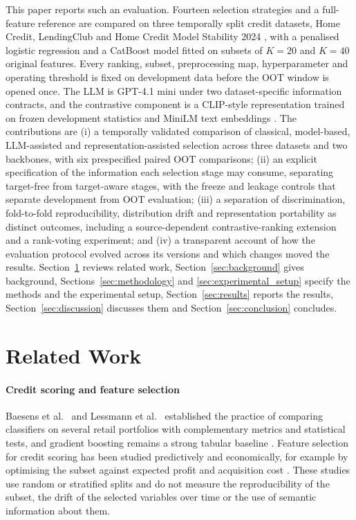 \documentclass[final,5p,twocolumn]{elsarticle}
\newcommand{\Kfeat}{K}
\begin{document}
This paper reports such an evaluation. Fourteen selection strategies and a full-feature reference are compared on three temporally split credit datasets, Home Credit, LendingClub and Home Credit Model Stability 2024 \cite{homecredit2018,lendingclub_kaggle,homecredit2024}, with a penalised logistic regression and a CatBoost model \cite{prokhorenkova2018} fitted on subsets of $\Kfeat=20$ and $\Kfeat=40$ original features. Every ranking, subset, preprocessing map, hyperparameter and operating threshold is fixed on development data before the OOT window is opened once. The LLM is GPT-4.1 mini \cite{openai2025gpt41} under two dataset-specific information contracts, and the contrastive component is a CLIP-style representation trained on frozen development statistics and MiniLM text embeddings \cite{wang2020minilm,reimers2019}. The contributions are (i) a temporally validated comparison of classical, model-based, LLM-assisted and representation-assisted selection across three datasets and two backbones, with six prespecified paired OOT comparisons; (ii) an explicit specification of the information each selection stage may consume, separating target-free from target-aware stages, with the freeze and leakage controls that separate development from OOT evaluation; (iii) a separation of discrimination, fold-to-fold reproducibility, distribution drift and representation portability as distinct outcomes, including a source-dependent contrastive-ranking extension and a rank-voting experiment; and (iv) a transparent account of how the evaluation protocol evolved across its versions and which changes moved the results. Section~\ref{sec:related_work} reviews related work, Section~\ref{sec:background} gives background, Sections~\ref{sec:methodology} and \ref{sec:experimental_setup} specify the methods and the experimental setup, Section~\ref{sec:results} reports the results, Section~\ref{sec:discussion} discusses them and Section~\ref{sec:conclusion} concludes.


\section{Related Work}
\label{sec:related_work}

\paragraph{Credit scoring and feature selection}
Baesens et al.\ \cite{baesens2003} and Lessmann et al.\ \cite{lessmann2015} established the practice of comparing classifiers on several retail portfolios with complementary metrics and statistical tests, and gradient boosting remains a strong tabular baseline \cite{gunnarsson2021}. Feature selection for credit scoring has been studied predictively and economically, for example by optimising the subset against expected profit and acquisition cost \cite{maldonado2017}. These studies use random or stratified splits and do not measure the reproducibility of the subset, the drift of the selected variables over time or the use of semantic information about them.
\end{document}
